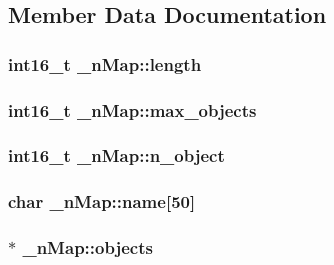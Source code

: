 \subsection{Member Data Documentation}
\hypertarget{struct__n_map_a772868c89751c4a27a7eccf076df5fc6}{}
\subsubsection[{length}]{\setlength{\rightskip}{0pt plus 5cm}int16\+\_\+t \+\_\+n\+Map\+::length}\label{struct__n_map_a772868c89751c4a27a7eccf076df5fc6}
\hypertarget{struct__n_map_a4570178b4b02516d89d54fc7be2ccd4f}{}
\subsubsection[{max\+\_\+objects}]{\setlength{\rightskip}{0pt plus 5cm}int16\+\_\+t \+\_\+n\+Map\+::max\+\_\+objects}\label{struct__n_map_a4570178b4b02516d89d54fc7be2ccd4f}
\hypertarget{struct__n_map_ac41305de4abf61844a81b7a67992f2a8}{}
\subsubsection[{n\+\_\+object}]{\setlength{\rightskip}{0pt plus 5cm}int16\+\_\+t \+\_\+n\+Map\+::n\+\_\+object}\label{struct__n_map_ac41305de4abf61844a81b7a67992f2a8}
\hypertarget{struct__n_map_a138f2aaca24cdaf5ec466c7889b21c15}{}
\subsubsection[{name}]{\setlength{\rightskip}{0pt plus 5cm}char \+\_\+n\+Map\+::name\mbox{[}50\mbox{]}}\label{struct__n_map_a138f2aaca24cdaf5ec466c7889b21c15}
\hypertarget{struct__n_map_ac3f3bf64347ac2accba1e388da7bfa07}{}
\subsubsection[{objects}]{$\ast$ \+\_\+n\+Map\+::objects}\label{struct__n_map_ac3f3bf64347ac2accba1e388da7bfa07}
\hypertarget{struct__n_map_a79dda563cc2d4f715a9185f1a970150b}{}
